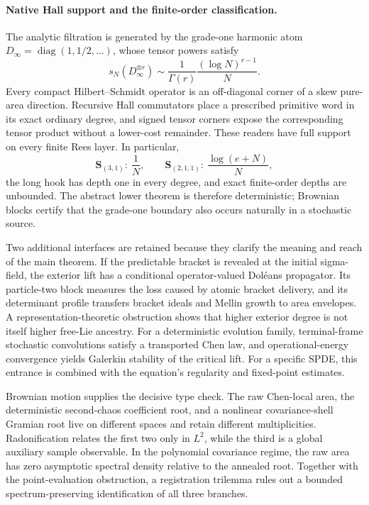 \documentclass[10pt,reqno]{amsart}
\theoremstyle{plain}
\theoremstyle{definition}
\theoremstyle{remark}
\begin{document}
\paragraph{Native Hall support and the finite-order classification.}
The analytic filtration is generated by the grade-one harmonic atom
$D_\infty=\operatorname{diag}(1,1/2,\ldots)$, whose tensor powers satisfy
\begin{equation}
 s_N(D_\infty^{\otimes r})
 \sim \frac1{\Gamma(r)}\frac{(\log N)^{r-1}}{N}.
 \label{eq:intro-harmonic-profile}
\end{equation}
Every compact Hilbert--Schmidt operator is an off-diagonal corner of a skew
pure-area direction.  Recursive Hall commutators place a prescribed primitive
word in its exact ordinary degree, and signed tensor corners expose the
corresponding tensor product without a lower-cost remainder.  These readers
have full support on every finite Rees layer.  In particular,
\begin{equation}
 \mathbf S_{(3,1)}:\ \frac1N,
 \qquad
 \mathbf S_{(2,1,1)}:\ \frac{\log(e+N)}N,
 \label{eq:intro-degree-four}
\end{equation}
the long hook has depth one in every degree, and exact finite-order depths are
unbounded.  The abstract lower theorem is therefore deterministic; Brownian
blocks certify that the grade-one boundary also occurs naturally in a
stochastic source.

Two additional interfaces are retained because they clarify the meaning and
reach of the main theorem.  If the predictable bracket is revealed at the
initial sigma-field, the exterior lift has a conditional operator-valued
Dol\'eans propagator.  Its particle-two block measures the loss caused by
atomic bracket delivery, and its determinant profile transfers bracket
ideals and Mellin growth to area envelopes.  A representation-theoretic
obstruction shows that higher exterior degree is not itself higher free-Lie
ancestry.  For a deterministic evolution family,
terminal-frame stochastic convolutions satisfy a transported Chen law, and
operational-energy convergence yields Galerkin stability of the critical
lift.  For a specific SPDE, this entrance is combined with the equation's regularity and fixed-point estimates.

Brownian motion supplies the decisive type check.  The raw Chen-local area,
the deterministic second-chaos coefficient root, and a nonlinear
covariance-shell Gramian root live on different spaces and retain different
multiplicities.  Radonification relates the first two only in $L^2$, while the
third is a global auxiliary sample observable.  In the polynomial covariance
regime, the raw area has zero asymptotic spectral density relative to the
annealed root.  Together with the point-evaluation obstruction, a registration
trilemma rules out a bounded spectrum-preserving identification of all three
branches.
\end{document}
